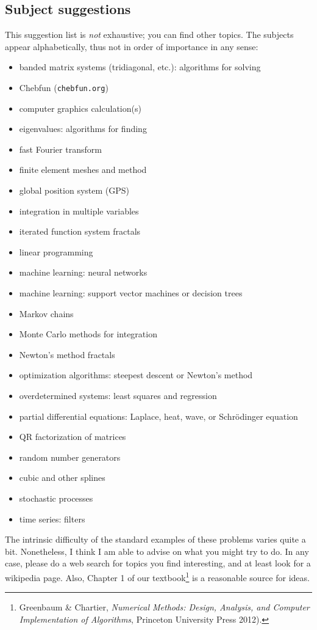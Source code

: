 \documentclass[11pt]{amsart}
\begin{document}
\subsection*{Subject suggestions}  This suggestion list is \emph{not} exhaustive; you can find other topics.  The subjects appear alphabetically, thus not in order of importance in any sense:
\begin{itemize}
\item banded matrix systems (tridiagonal, etc.): algorithms for solving
\item Chebfun (\texttt{chebfun.org})
\item computer graphics calculation(s)
\item eigenvalues: algorithms for finding
\item fast Fourier transform
\item finite element meshes and method
\item global position system (GPS)
\item integration in multiple variables
\item iterated function system fractals
\item linear programming
\item machine learning: neural networks
\item machine learning: support vector machines or decision trees
\item Markov chains
\item Monte Carlo methods for integration
\item Newton's method fractals
\item optimization algorithms: steepest descent or Newton's method
\item overdetermined systems: least squares and regression
\item partial differential equations: Laplace, heat, wave, or Schr\"odinger equation
\item QR factorization of matrices
\item random number generators
\item cubic and other splines
\item stochastic processes
\item time series: filters
\end{itemize}

\medskip \noindent The intrinsic difficulty of the standard examples of these problems varies quite a bit. Nonetheless, I think I am able to advise on what you might try to do.  In any case, please do a web search for topics you find interesting, and at least look for a wikipedia page.  Also, Chapter 1 of our textbook\footnote{Greenbaum \& Chartier, \emph{Numerical Methods: Design, Analysis, and Computer Implementation of Algorithms}, Princeton University Press 2012).} is a reasonable source for ideas.
\end{document}
